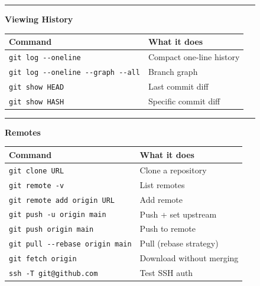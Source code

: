 \documentclass[
  9pt,
  a4paper,
  DIV=11,
  numbers=noendperiod]{scrartcl}
\begin{document}
\begin{figure}
\begin{minipage}{0.50\linewidth}
\end{minipage}%
\newline
\begin{minipage}{0.50\linewidth}

\begin{center}\rule{0.5\linewidth}{0.5pt}\end{center}

\end{minipage}%
%
\begin{minipage}{0.50\linewidth}
\textbf{Viewing History}\end{minipage}%
\newline
\begin{minipage}{0.50\linewidth}

\begin{longtable}[]{@{}ll@{}}
\toprule\noalign{}
Command & What it does \\
\midrule\noalign{}
\endhead
\bottomrule\noalign{}
\endlastfoot
\texttt{git\ log\ -\/-oneline} & Compact one-line history \\
\texttt{git\ log\ -\/-oneline\ -\/-graph\ -\/-all} & Branch graph \\
\texttt{git\ show\ HEAD} & Last commit diff \\
\texttt{git\ show\ HASH} & Specific commit diff \\
\end{longtable}

\end{minipage}%
%
\begin{minipage}{0.50\linewidth}

\begin{center}\rule{0.5\linewidth}{0.5pt}\end{center}

\end{minipage}%
\newline
\begin{minipage}{0.50\linewidth}
\textbf{Remotes}\end{minipage}%
%
\begin{minipage}{0.50\linewidth}

\begin{longtable}[]{@{}ll@{}}
\toprule\noalign{}
Command & What it does \\
\midrule\noalign{}
\endhead
\bottomrule\noalign{}
\endlastfoot
\texttt{git\ clone\ URL} & Clone a repository \\
\texttt{git\ remote\ -v} & List remotes \\
\texttt{git\ remote\ add\ origin\ URL} & Add remote \\
\texttt{git\ push\ -u\ origin\ main} & Push + set upstream \\
\texttt{git\ push\ origin\ main} & Push to remote \\
\texttt{git\ pull\ -\/-rebase\ origin\ main} & Pull (rebase strategy) \\
\texttt{git\ fetch\ origin} & Download without merging \\
\texttt{ssh\ -T\ git@github.com} & Test SSH auth \\
\end{longtable}


\end{minipage}
\end{figure}
\end{document}
